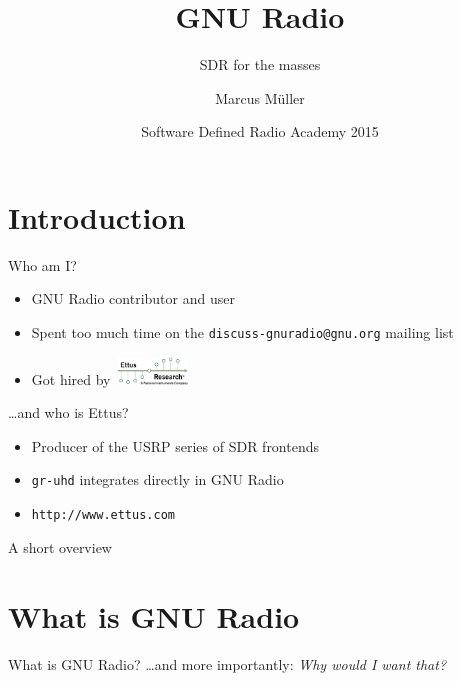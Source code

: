 \documentclass{beamer}
\title[GNU Radio -- SDR for the masses]{GNU Radio}
\subtitle{SDR for the masses}
\author{Marcus Müller}
\date{Software Defined Radio Academy 2015}
\begin{document}
\frame{\titlepage}


\section{Introduction}

\begin{frame}{Who am I?}
  \begin{itemize}
    \item GNU Radio contributor and user
    \item Spent too much time on the \texttt{discuss-gnuradio@gnu.org} mailing list
    \item Got hired by \,\includegraphics[height=2em]{ettuslogo.png}
  \end{itemize}
  \pause
  \ldots and who is Ettus?
  \begin{itemize}
    \item Producer of the USRP series of SDR frontends\\
    \item \texttt{gr-uhd} integrates directly in GNU Radio
    \item \texttt{http://www.ettus.com}
  \end{itemize}
\end{frame}

\begin{frame}{A short overview}
  \tableofcontents{}
\end{frame}

\section{What is GNU Radio}

\begin{frame}{What is GNU Radio?}
  \dots and more importantly: \emph{Why would I want that?}
\end{frame}
\end{document}
